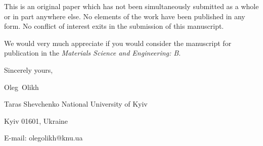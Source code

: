 \documentclass[preprint]{elsarticle}
\begin{document}
This is an original paper which has not been simultaneously submitted as a whole or in part anywhere else.
No elements of the work have been published in any form.
No conflict of interest exits in the submission of this manuscript.


We would  very much appreciate if you would consider the manuscript for publication in the \emph{Materials Science and Engineering: B}.

%


\vspace{3mm}

Sincerely yours,

Oleg~Olikh


Taras Shevchenko National University of Kyiv


Kyiv 01601, Ukraine

E-mail: olegolikh@knu.ua


\end{document}
